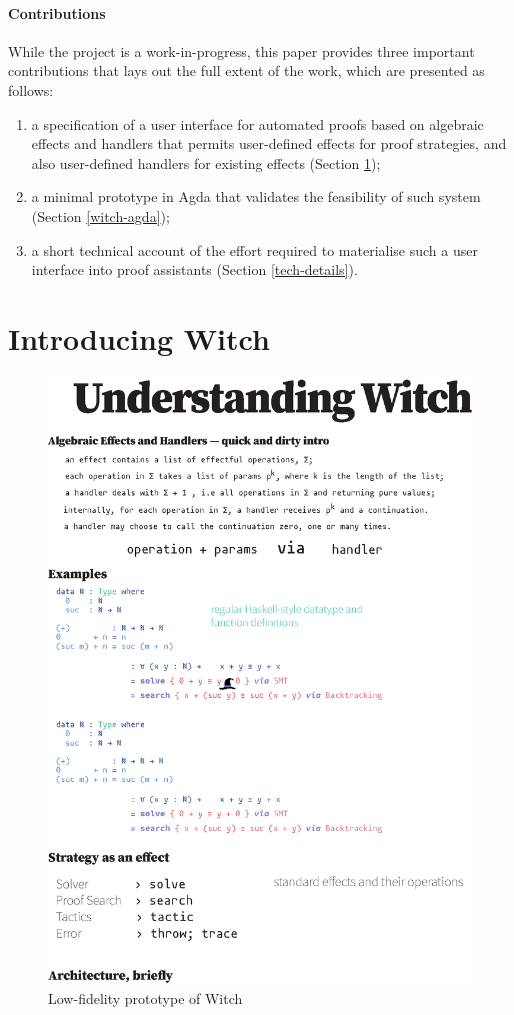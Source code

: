 \documentclass[acmsmall]{acmart}
\begin{document}
\paragraph{Contributions} While the project is a work-in-progress, this paper
provides three important contributions that lays out the full extent of the
work, which are presented as follows:
\begin{enumerate}
\item a specification of a user interface for automated proofs based on
  algebraic effects and handlers that permits user-defined effects for proof
  strategies, and also user-defined handlers for existing effects (Section \ref{intro-witch});
\item a minimal prototype in Agda that validates the feasibility of such system
  (Section \ref{witch-agda});
\item a short technical account of the effort required to materialise such a
  user interface into proof assistants (Section \ref{tech-details}).
\end{enumerate}

\section{Introducing Witch} \label{intro-witch}

\begin{figure}[!ht]
   \centering
    \includegraphics[width=\textwidth]{image/witch.eps}
    \caption{Low-fidelity prototype of Witch}
    \label{fig:prototype}
\end{figure}
\end{document}
